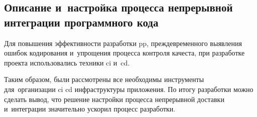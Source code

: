 \subsection{Описание и~настройка процесса непрерывной интеграции программного кода}
\label{sec:testing:ci}

Для повышения эффективности разработки \gls{pp}, преждевременного выявления ошибок кодирования и~упрощения процесса контроля качеста, при разработке проекта использовались техники \gls{ci} и~\gls{cd}.







Таким образом, были рассмотрены все необходимы инструменты для~организации \gls{ci} \gls{cd} инфраструктуры приложения. По итогу разработки можно сделать вывод, что решение настройки процесса непрерывной доставки и~интеграции значительно ускорил процесс разработки.